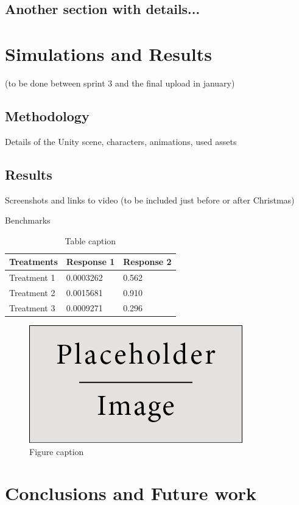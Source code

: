 \documentclass[preprint,12pt]{elsarticle}
\begin{document}
\subsection{Another section with details...}

\section{Simulations and Results}

(to be done between sprint 3 and the final upload in january)

\subsection{Methodology}

Details of the Unity scene, characters, animations, used assets

\subsection{Results}

Screenshots and links to video (to be included just before or after Christmas)

Benchmarks

\begin{table}[h]
\centering
\begin{tabular}{l l l}
\hline
\textbf{Treatments} & \textbf{Response 1} & \textbf{Response 2}\\
\hline
Treatment 1 & 0.0003262 & 0.562 \\
Treatment 2 & 0.0015681 & 0.910 \\
Treatment 3 & 0.0009271 & 0.296 \\
\hline
\end{tabular}
\caption{Table caption}
\end{table}

\begin{figure}[h]
\centering\includegraphics[width=0.4\linewidth]{placeholder}
\caption{Figure caption}
\end{figure}


\section{Conclusions and Future work}
\end{document}
